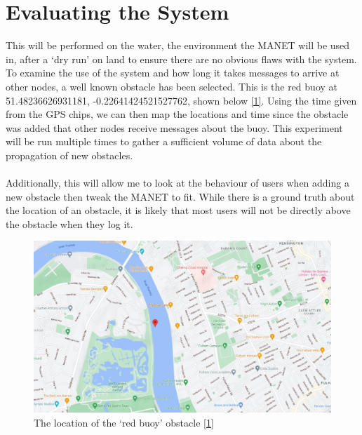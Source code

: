 \documentclass[10pt, a4paper]{article}
\begin{document}

\FloatBarrier
\section*{Evaluating the System}
This will be performed on the water, the environment the MANET will be used in, after a `dry run' on land to ensure there are no obvious flaws with the system. 
To examine the use of the system and how long it takes messages to arrive at other nodes, a well known obstacle has been selected. This is the red buoy at 51.48236626931181, -0.22641424521527762, shown below \hyperref[maps]{[1]}. Using the time given from the GPS chips, we can then map the locations and time since the obstacle was added that other nodes receive messages about the buoy. This experiment will be run multiple times to gather a sufficient volume of data about the propagation of new obstacles. \\ \\ 
Additionally, this will allow me to look at the behaviour of users when adding a new obstacle then tweak the MANET to fit. While there is a ground truth about the location of an obstacle, it is likely that most users will not be directly above the obstacle when they log it. 

\begin{figure}[h]
\caption{The location of the `red buoy' obstacle \hyperref[maps]{[1]}}
\begin{center}
\includegraphics[scale=0.3]{buoy.jpg}
\end{center}
\end{figure}
\end{document}
